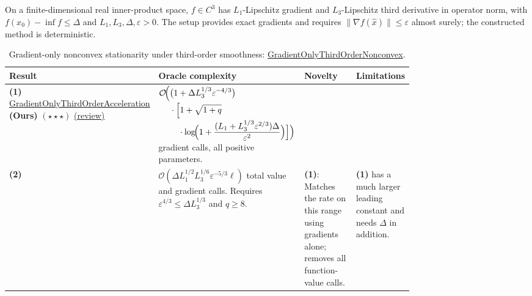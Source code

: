 \begin{table}[tp]
\centering
\caption{Gradient-only nonconvex stationarity under third-order smoothness: \href{https://github.com/k3nfalt/longtails/blob/main/LongTails/Setups/GradientOnlyThirdOrderNonconvex.lean}{GradientOnlyThirdOrderNonconvex}.}\label{tab:GradientOnlyThirdOrderNonconvex}
\parbox{\linewidth}{\footnotesize On a finite-dimensional real inner-product space, $f\in C^3$ has $L_1$-Lipschitz gradient and $L_3$-Lipschitz third derivative in operator norm, with $f(x_0)-\inf f\leq\Delta$ and $L_1,L_3,\Delta,\varepsilon>0$. The setup provides exact gradients and requires $\|\nabla f(\widehat x)\|\leq\varepsilon$ almost surely; the constructed method is deterministic.}\par\smallskip
\begin{threeparttable}
\footnotesize
\setlength{\tabcolsep}{4pt}\renewcommand{\arraystretch}{1.25}
\begin{tabularx}{\linewidth}{@{}>{\raggedright\arraybackslash}p{0.20\linewidth}>{\raggedright\arraybackslash}p{0.32\linewidth}>{\raggedright\arraybackslash}p{0.25\linewidth}>{\raggedright\arraybackslash}X@{}}
\toprule
\textbf{Result} & \textbf{Oracle complexity} & \textbf{Novelty} & \textbf{Limitations} \\
\midrule
\textbf{(1)} \href{https://github.com/k3nfalt/longtails/blob/main/LongTails/Theorems/GradientOnlyThirdOrderAcceleration.lean}{Gradient\allowbreak Only\allowbreak Third\allowbreak Order\allowbreak Acceleration} \textbf{(Ours)} $(\star\star\star)$ \href{https://github.com/k3nfalt/longtails/blob/main/scripts/reviews/GradientOnlyThirdOrderAcceleration.md}{(review)}
& $\begin{aligned}\mathcal{O}\!\Bigl(&\bigl(1+\Delta L_3^{1/3}\varepsilon^{-4/3}\bigr)\\[-2pt]&\cdot\Bigl[1+\sqrt{1+q}\\[-2pt]&\quad\cdot\log\!\Bigl(1+\frac{(L_1+L_3^{1/3}\varepsilon^{2/3})\Delta}{\varepsilon^2}\Bigr)\Bigr]\Bigr)\end{aligned}$ gradient calls, all positive parameters.
& & \\
\midrule[1.2pt]
\textbf{(2)} \citep[Theorem 2]{tdsCarmonEtAl2017}
& $\mathcal{O}(\Delta L_1^{1/2}L_3^{1/6}\varepsilon^{-5/3}\ell)$ total value and gradient calls. Requires $\varepsilon^{4/3}\leq\Delta L_3^{1/3}$ and $q\geq8$.
& \textbf{(1)}: Matches the rate on this range using gradients alone; removes all function-value calls.
& \textbf{(1)} has a much larger leading constant and needs $\Delta$ in addition. \\

\end{tabularx}
\end{threeparttable}
\end{table}
